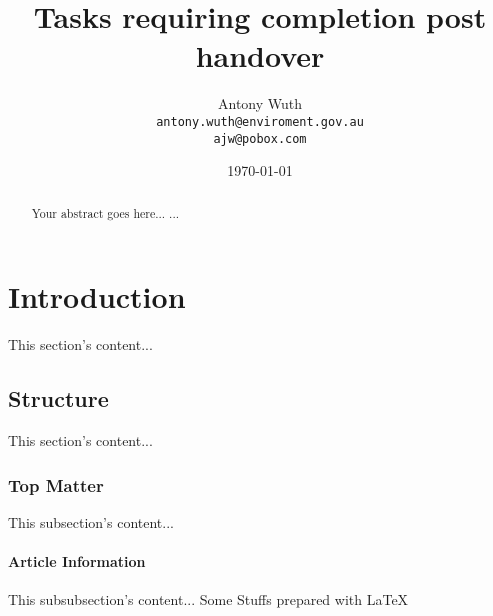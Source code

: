 \documentclass[11pt,a4paper,oneside]{report}
\begin{document}
\title{Tasks requiring completion post handover}
\author{Antony Wuth \\
\texttt{antony.wuth@enviroment.gov.au} \\
\texttt{ajw@pobox.com}}
\date{\today}
\maketitle
\tableofcontents
\begin{abstract}
Your abstract goes here...
...
\end{abstract}
\chapter{Introduction}
This section's content...
 
 \section{Structure}
 This section's content...
  
  \subsection{Top Matter}
  This subsection's content...
   
   \subsubsection{Article Information}
   This subsubsection's content...
Some Stuffs
prepared with \LaTeX{}
\end{document}
